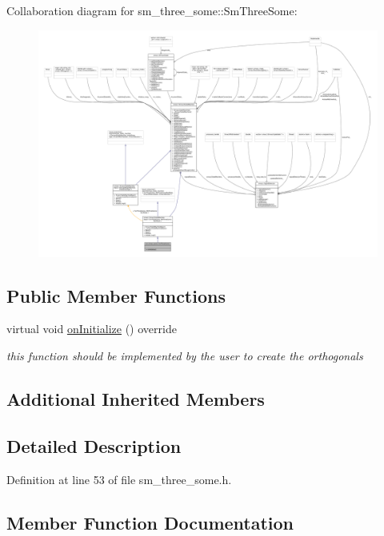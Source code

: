 Collaboration diagram for sm\+\_\+three\+\_\+some\+:\+:Sm\+Three\+Some\+:
\nopagebreak
\begin{figure}[H]
\begin{center}
\leavevmode
\includegraphics[width=350pt]{structsm__three__some_1_1SmThreeSome__coll__graph}
\end{center}
\end{figure}
\subsection*{Public Member Functions}
\begin{DoxyCompactItemize}
\item 
virtual void \hyperlink{structsm__three__some_1_1SmThreeSome_ac811ac731023ccbab1db358d0efa1c0e}{on\+Initialize} () override
\begin{DoxyCompactList}\small\item\em this function should be implemented by the user to create the orthogonals \end{DoxyCompactList}\end{DoxyCompactItemize}
\subsection*{Additional Inherited Members}


\subsection{Detailed Description}


Definition at line 53 of file sm\+\_\+three\+\_\+some.\+h.



\subsection{Member Function Documentation}
